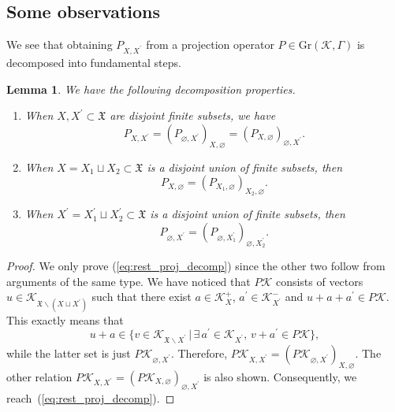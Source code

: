 \documentclass[pdftex]{sigma}
\numberwithin{equation}{section}
\newtheorem{Lemma}[Theorem]{Lemma}
\newcommand{\pr}[1]{#1^{\prime}}
\newcommand{\mfrak}[1]{\mathfrak{#1}}
\newcommand{\mcal}[1]{\mathcal{#1}}
\newcommand{\mrm}[1]{\mathrm{#1}}
\begin{document}
\subsection{Some observations}
We see that obtaining $P_{X,\pr{X}}$ from a projection operator $P\in\mrm{Gr}(\mcal{K},\Gamma)$ is decomposed into fundamental steps.
\begin{Lemma}
\label{lem:rest_decomp} We have the following decomposition properties.
\begin{enumerate}\itemsep=0pt
\item[$1.$] 	When $X, \pr{X}\subset\mfrak{X}$ are disjoint finite subsets, we have
		\begin{equation}		\label{eq:rest_proj_decomp}
			P_{X,\pr{X}}=(P_{\varnothing,\pr{X}})_{X,\varnothing}=(P_{X,\varnothing})_{\varnothing, \pr{X}}.
		\end{equation}
\item[$2.$] 	When $X=X_{1}\sqcup X_{2}\subset \mfrak{X}$ is a disjoint union of finite subsets, then
		\begin{equation*}
			P_{X,\varnothing}=(P_{X_{1},\varnothing})_{X_{2},\varnothing}.
		\end{equation*}
\item[$3.$] 	When $\pr{X}=\pr{X}_{1}\sqcup \pr{X}_{2}\subset\mfrak{X}$ is a disjoint union of finite subsets, then
		\begin{equation*}
			P_{\varnothing,\pr{X}}=(P_{\varnothing,\pr{X}_{1}})_{\varnothing,\pr{X}_{2}}.
		\end{equation*}
\end{enumerate}
\end{Lemma}
\begin{proof}We only prove (\ref{eq:rest_proj_decomp}) since the other two follow from arguments of the same type.
We have noticed that $P\mcal{K}$ consists of vectors $u\in \mcal{K}_{\mfrak{X}\backslash (X\sqcup\pr{X})}$ such that there exist $a\in \mcal{K}_{X}^{+}$, $\pr{a}\in \mcal{K}_{\pr{X}}^{-}$ and $u+a+\pr{a}\in P\mcal{K}$. This exactly means that
\begin{equation*}
	u+a\in \{v\in \mcal{K}_{\mfrak{X}\backslash \pr{X}}\,|\, \exists\, \pr{a}\in \mcal{K}_{\pr{X}},\, v+\pr{a}\in P\mcal{K}\},
\end{equation*}
while the latter set is just $P\mcal{K}_{\varnothing,\pr{X}}$. Therefore, $P\mcal{K}_{X,\pr{X}}=(P\mcal{K}_{\varnothing,\pr{X}})_{X,\varnothing}$. The other relation $P\mcal{K}_{X,\pr{X}}=(P\mcal{K}_{X,\varnothing})_{\varnothing,\pr{X}}$ is also shown. Consequently, we reach~(\ref{eq:rest_proj_decomp}).
\end{proof}
\end{document}
